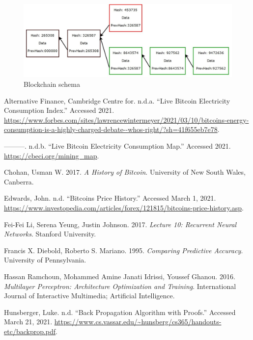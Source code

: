 \documentclass[
]{article}
\newlength{\cslhangindent}
\newenvironment{cslreferences}%
  {\setlength{\parindent}{0pt}%
  \everypar{\setlength{\hangindent}{\cslhangindent}}\ignorespaces}%
  {\par}
\begin{document}
\begin{figure}
\includegraphics[width=0.8\linewidth]{images/blockchain} \caption{Blockchain schema}\label{fig:blockchain}
\end{figure}

\hypertarget{refs}{}
\begin{cslreferences}
\leavevmode\hypertarget{ref-energy_index}{}%
Alternative Finance, Cambridge Centre for. n.d.a. ``Live Bitcoin
Electricity Consumption Index.'' Accessed 2021.
\url{https://www.forbes.com/sites/lawrencewintermeyer/2021/03/10/bitcoins-energy-consumption-is-a-highly-charged-debate--whos-right/?sh=41f655eb7e78}.

\leavevmode\hypertarget{ref-energy_map}{}%
---------. n.d.b. ``Live Bitcoin Electricity Consumption Map.'' Accessed
2021. \url{https://cbeci.org/mining_map}.

\leavevmode\hypertarget{ref-A_History_of_Bitcoin}{}%
Chohan, Usman W. 2017. \emph{A History of Bitcoin}. University of New
South Wales, Canberra.

\leavevmode\hypertarget{ref-Bitcoin_history}{}%
Edwards, John. n.d. ``Bitcoins Price History.'' Accessed March 1, 2021.
\url{https://www.investopedia.com/articles/forex/121815/bitcoins-price-history.asp}.

\leavevmode\hypertarget{ref-RNN_Stanford}{}%
Fei-Fei Li, Serena Yeung, Justin Johnson. 2017. \emph{Lecture 10:
Recurrent Neural Networks}. Stanford University.

\leavevmode\hypertarget{ref-DM_paper}{}%
Francis X. Diebold, Roberto S. Mariano. 1995. \emph{Comparing Predictive
Accuracy}. University of Pennsylvania.

\leavevmode\hypertarget{ref-mlp_architecture}{}%
Hassan Ramchoun, Mohammed Amine Janati Idrissi, Youssef Ghanou. 2016.
\emph{Multilayer Perceptron: Architecture Optimization and Training}.
International Journal of Interactive Multimedia; Artificial
Intelligence.

\leavevmode\hypertarget{ref-backpropagation_proofs}{}%
Hunsberger, Luke. n.d. ``Back Propagation Algorithm with Proofs.''
Accessed March 21, 2021.
\url{https://www.cs.vassar.edu/~hunsberg/cs365/handouts-etc/backprop.pdf}.


\end{cslreferences}
\end{document}
